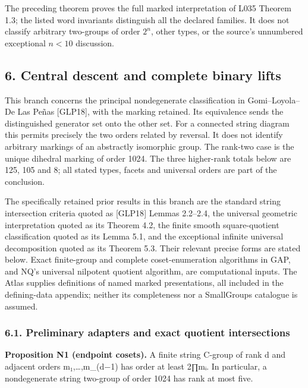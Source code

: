 \documentclass[
  11pt,
  a4paper,
]{article}
\begin{document}
The preceding theorem proves the full marked interpretation of L035
Theorem 1.3; the listed word invariants distinguish all the declared
families. It does not classify arbitrary two-groups of order \(2^n\),
other types, or the source's unnumbered exceptional \(n<10\) discussion.

\subsection{6. Central descent and complete binary
lifts}\label{central-descent-and-complete-binary-lifts}

This branch concerns the principal nondegenerate classification in
Gomi--Loyola--De Las Peñas {[}GLP18{]}, with the marking retained. Its
equivalence sends the distinguished generator set onto the other set.
For a connected string diagram this permits precisely the two orders
related by reversal. It does not identify arbitrary markings of an
abstractly isomorphic group. The rank-two case is the unique dihedral
marking of order 1024. The three higher-rank totals below are 125, 105
and 8; all stated types, facets and universal orders are part of the
conclusion.

The specifically retained prior results in this branch are the standard
string intersection criteria quoted as {[}GLP18{]} Lemmas 2.2--2.4, the
universal geometric interpretation quoted as its Theorem 4.2, the finite
smooth square-quotient classification quoted as its Lemma 5.1, and the
exceptional infinite universal decomposition quoted as its Theorem 5.3.
Their relevant precise forms are stated below. Exact finite-group and
complete coset-enumeration algorithms in GAP, and NQ's universal
nilpotent quotient algorithm, are computational inputs. The Atlas
supplies definitions of named marked presentations, all included in the
defining-data appendix; neither its completeness nor a SmallGroups
catalogue is assumed.

\subsubsection{6.1. Preliminary adapters and exact quotient
intersections}\label{preliminary-adapters-and-exact-quotient-intersections}

\textbf{Proposition N1 (endpoint cosets).} A finite string C-group of
rank d and adjacent orders m₁,\ldots,m\_(d−1) has order at least 2∏mᵢ.
In particular, a nondegenerate string two-group of order 1024 has rank
at most five.
\end{document}
